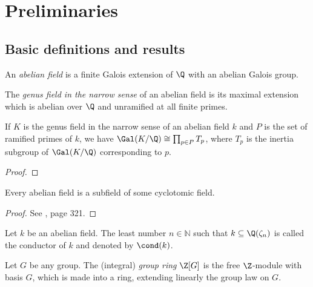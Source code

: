 \chapter{Preliminaries}
\setcounter{page}{1}

\section{Basic definitions and results}
\begin{definition}
An \textit{abelian field} is a finite Galois extension of $\Q$ with an abelian Galois group. 
\end{definition}

\begin{definition}
The \textit{genus field in the narrow sense} of an abelian field is its maximal extension which is abelian over $\Q$ and unramified at all finite primes. %
\end{definition}

\begin{lemma}\label{genus}
If $K$ is the genus field in the narrow sense of an abelian field $k$ and $P$ is the set of ramified primes of $k$, we have $\Gal(K/\Q)\cong \prod_{p\in P} T_p$, where $T_p$ is the inertia subgroup of $\Gal(K/\Q)$ corresponding to $p$.
\end{lemma}
\begin{proof}
\end{proof}

\begin{theorem}
Every abelian field is a subfield of some cyclotomic field.
\end{theorem}
\begin{proof}
See \citep{washington1997}, page 321.
\end{proof}

\begin{definition}
Let $k$ be an abelian field. The least number $n\in\mathbb{N}$ such that $k\subseteq \Q(\zeta_n)$ is called the conductor of $k$ and denoted by $\cond(k)$.
\end{definition}

\begin{definition}
Let $G$ be any group. The (integral) \textit{group ring} $\Z[G]$ is the free $\Z$-module with basis $G$, which is made into a ring, extending linearly the group law on $G$.
\end{definition}

